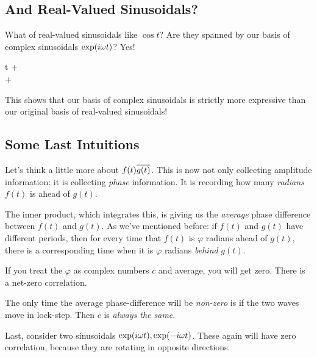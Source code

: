 \subsection{And Real-Valued Sinusoidals?}

What of real-valued sinusoidals like $\cos t$? Are they spanned by our
basis of complex sinusoidals $\exp\mathopen{}\left( {i\omega t} \right)\mathclose{}$? Yes!

\begin{nedqn}
  \cos \omega t
\eqcol
  \half {}
  +
  \half {}
\\\eqcol
  \half
  +
  \half
\\\eqcol
\end{nedqn}

This shows that our basis of complex sinusoidals is strictly more
expressive than our original basis of real-valued sinusoidals!

\subsection{Some Last Intuitions}

Let's think a little more about $f(t)\overline{g(t)}$. This is now not only
collecting amplitude information: it is collecting \emph{phase}
information. It is recording how many \emph{radians} $f(t)$ is ahead of
$g(t)$.

The inner product, which integrates this, is giving us the
\emph{average} phase difference between $f(t)$ and $g(t)$. As we've
mentioned before: if $f(t)$ and $g(t)$ have different periods, then for
every time that $f(t)$ is $\varphi$ radians ahead of $g(t)$, there is a
corresponding time when it is $\varphi$ radians \emph{behind} $g(t)$.

If you treat the $\varphi$ as complex numbers $c$ and average, you will
get zero. There is a net-zero correlation.

The only time the average phase-difference will be \emph{non-zero} is if
the two waves move in lock-step. Then $c$ is \emph{always the same}.

Last, consider two sinusoidals $\exp\mathopen{}\left( {i\omega t} \right)\mathclose{}, \exp\mathopen{}\left( {-i\omega t} \right)\mathclose{}$.
These again will have zero correlation, because they are rotating in
opposite directions.
